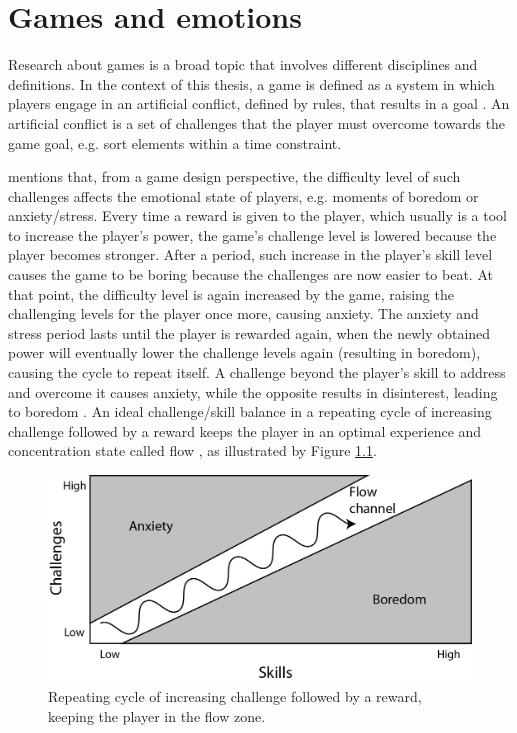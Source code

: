 \chapter{Games and emotions}
\label{ch:literature-games}

Research about games is a broad topic that involves different disciplines and definitions. In the context of this thesis, a game is defined as a system in which players engage in an artificial conflict, defined by rules, that results in a goal \parencite{salen2004rules}. An artificial conflict is a set of challenges that the player must overcome towards the game goal, e.g. sort elements within a time constraint.

\textcite{schell2014art} mentions that, from a game design perspective, the difficulty level of such challenges affects the emotional state of players, e.g. moments of boredom or anxiety/stress. Every time a reward is given to the player, which usually is a tool to increase the player's power, the game's challenge level is lowered because the player becomes stronger. After a period, such increase in the player's skill level causes the game to be boring because the challenges are now easier to beat. At that point, the difficulty level is again increased by the game, raising the challenging levels for the player once more, causing anxiety. The anxiety and stress period lasts until the player is rewarded again, when the newly obtained power will eventually lower the challenge levels again (resulting in boredom), causing the cycle to repeat itself. A challenge beyond the player's skill to address and overcome it causes anxiety, while the opposite results in disinterest, leading to boredom \parencite{chen2007flow}. An ideal challenge/skill balance in a repeating cycle of increasing challenge followed by a reward keeps the player in an optimal experience and concentration state called flow \parencite{csikszentmihalyi1991flow}, as illustrated by Figure \ref{fig:flow-schell}.

\begin{figure}[h!]
    \centering
    \includegraphics[scale=0.8]{figures/flow-schell.png}
    \caption{Repeating cycle of increasing challenge followed by a reward, keeping the player in the flow zone. \parencite{schell2014art}}
    \label{fig:flow-schell}
\end{figure}

